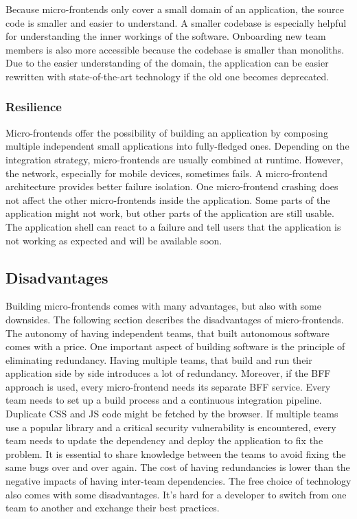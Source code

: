 Because micro-frontends only cover a small domain of an application, the source code is smaller and easier to understand. A smaller codebase is especially helpful for understanding the inner workings of the software. Onboarding new team members is also more accessible because the codebase is smaller than monoliths.
Due to the easier understanding of the domain, the application can be easier rewritten with state-of-the-art technology if the old one becomes deprecated. \cite{book:2020:geers:background:micro-frontends:micro-frontends-in-action}

\subsubsection{Resilience}\label{subsubsection:background:micro-frontend-resilience}

Micro-frontends offer the possibility of building an application by composing multiple independent small applications into fully-fledged ones. Depending on the integration strategy, micro-frontends are usually combined at runtime. However, the network, especially for mobile devices, sometimes fails. A micro-frontend architecture provides better failure isolation. One micro-frontend crashing does not affect the other micro-frontends inside the application. Some parts of the application might not work, but other parts of the application are still usable. The application shell can react to a failure and tell users that the application is not working as expected and will be available soon. \cite[10-11]{article:2021:perltonen:background:micro-frontends:motivations-benefits-and-issues}

\subsection{Disadvantages}\label{subsection:background:micro-frontend-downsides}

Building micro-frontends comes with many advantages, but also with some downsides. The following section describes the disadvantages of micro-frontends. The autonomy of having independent teams, that built autonomous software comes with a price. One important aspect of building software is the principle of eliminating redundancy. Having multiple teams, that build and run their application side by side introduces a lot of redundancy. Moreover, if the \ac{BFF} approach is used, every micro-frontend needs its separate \ac{BFF} service. Every team needs to set up a build process and a continuous integration pipeline. Duplicate \ac{CSS} and \ac{JS} code might be fetched by the browser. If multiple teams use a popular library and a critical security vulnerability is encountered, every team needs to update the dependency and deploy the application to fix the problem. It is essential to share knowledge between the teams to avoid fixing the same bugs over and over again. The cost of having redundancies is lower than the negative impacts of having inter-team dependencies. The free choice of technology also comes with some disadvantages. It's hard for a developer to switch from one team to another and exchange their best practices. \cite[17-18]{book:2020:geers:background:micro-frontends:micro-frontends-in-action}


